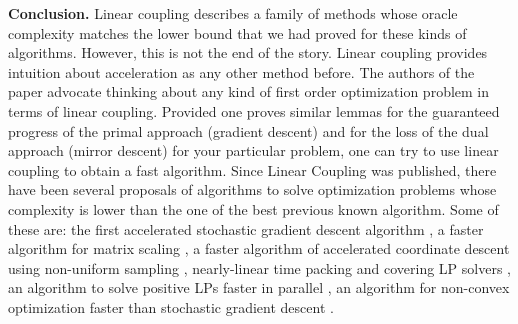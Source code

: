 \textbf{Conclusion.} Linear coupling describes a family of methods whose oracle complexity matches the lower bound that we had proved for these kinds of algorithms. However, this is not the end of the story. Linear coupling provides intuition about acceleration as any other method before. The authors of the paper advocate thinking about any kind of first order optimization problem in terms of linear coupling. Provided one proves similar lemmas for the guaranteed progress of the primal approach (gradient descent) and for the loss of the dual approach (mirror descent) for your particular problem, one can try to use linear coupling to obtain a fast algorithm. Since Linear Coupling was published, there have been several proposals of algorithms to solve optimization problems whose complexity is lower than the one of the best previous known algorithm. Some of these are: the first accelerated stochastic gradient descent algorithm \cite{allen2016katyusha}, a faster algorithm for matrix scaling \cite{allen2017much}, a faster algorithm of accelerated coordinate descent using non-uniform sampling \cite{allen2016even}, nearly-linear time packing and covering LP solvers \cite{allen2014nearly}, an algorithm to solve positive LPs faster in parallel \cite{allen2014using}, an algorithm for non-convex optimization faster than stochastic gradient descent \cite{allen2017natasha}.

